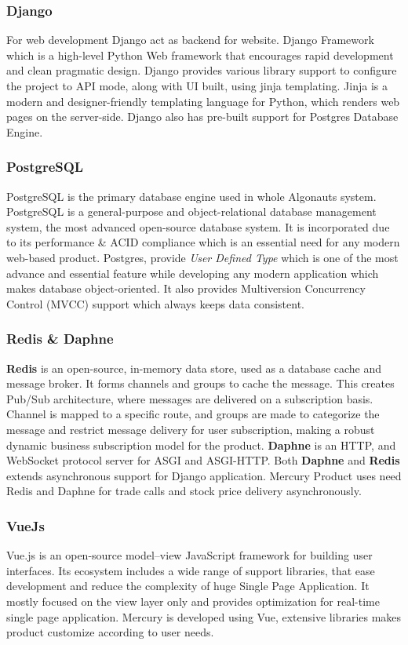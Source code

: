\subsubsection{Django}

For web development Django act as backend for website. Django Framework which is a high-level Python Web framework that encourages rapid development and clean pragmatic design. Django provides various library support to configure the project to API mode, along with UI built, using jinja templating. Jinja is a modern and designer-friendly templating language for Python, which renders web pages on the server-side. Django also has pre-built support for Postgres Database Engine. 

\subsubsection{PostgreSQL}
PostgreSQL is the primary database engine used in whole Algonauts system. PostgreSQL is a general-purpose and object-relational database management system, the most advanced open-source database system. It is incorporated due to its performance \& ACID compliance which is an essential need for any modern web-based product. Postgres, provide \textit{User Defined Type} which is one of the most advance and essential feature while developing any modern application which makes database object-oriented. It also provides Multiversion Concurrency Control (MVCC) support which always keeps data consistent.

\subsubsection{Redis \& Daphne}
\textbf{Redis} is an open-source, in-memory data store, used as a database cache and message broker. It forms channels and groups to cache the message. This creates Pub/Sub architecture, where messages are delivered on a subscription basis. Channel is mapped to a specific route, and groups are made to categorize the message and restrict message delivery for user subscription, making a robust dynamic business subscription model for the product.  \textbf{Daphne} is an HTTP,  and WebSocket protocol server for ASGI and ASGI-HTTP. Both \textbf{Daphne} and \textbf{Redis} extends asynchronous support for Django application. Mercury Product uses need Redis and Daphne for trade calls and stock price delivery asynchronously.

\subsubsection{VueJs}
Vue.js is an open-source model–view JavaScript framework for building user interfaces. Its ecosystem includes a wide range of support libraries, that ease development and reduce the complexity of huge Single Page Application. It mostly focused on the view layer only and provides optimization for real-time single page application. Mercury is developed using Vue, extensive libraries makes product customize according to user needs.



